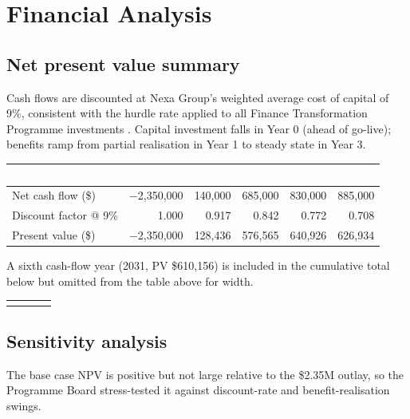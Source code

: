 \section{Financial Analysis}

\subsection{Net present value summary}
Cash flows are discounted at Nexa Group's weighted average cost of capital of 9\%, consistent
with the hurdle rate applied to all Finance Transformation Programme investments
\cite{castellan2025itspend}. Capital investment falls in Year 0 (ahead of go-live); benefits
ramp from partial realisation in Year 1 to steady state in Year 3.

\begin{center}
\footnotesize
\begin{tabular}{@{}l r r r r r@{}}
\toprule
\rowcolor{navy}
\textcolor{white}{\textbf{Year}} & \textcolor{white}{\textbf{2026}} & \textcolor{white}{\textbf{2027}}
  & \textcolor{white}{\textbf{2028}} & \textcolor{white}{\textbf{2029}} & \textcolor{white}{\textbf{2030}} \\
\midrule
Net cash flow (\$) & $-$2,350,000 & 140,000 & 685,000 & 830,000 & 885,000 \\
\rowcolor{paleblue}
Discount factor @ 9\% & 1.000 & 0.917 & 0.842 & 0.772 & 0.708 \\
Present value (\$) & $-$2,350,000 & 128,436 & 576,565 & 640,926 & 626,934 \\
\bottomrule
\end{tabular}

\vspace{4pt}
\footnotesize\color{slate} A sixth cash-flow year (2031, PV \$610,156) is included in the
cumulative total below but omitted from the table above for width.
\end{center}

\begin{center}
\begin{tabularx}{0.85\linewidth}{@{}Y Y Y Y@{}}
 &
 &
 &
 \\
\end{tabularx}
\end{center}

\subsection{Sensitivity analysis}
The base case NPV is positive but not large relative to the \$2.35M outlay, so the Programme
Board stress-tested it against discount-rate and benefit-realisation swings.

